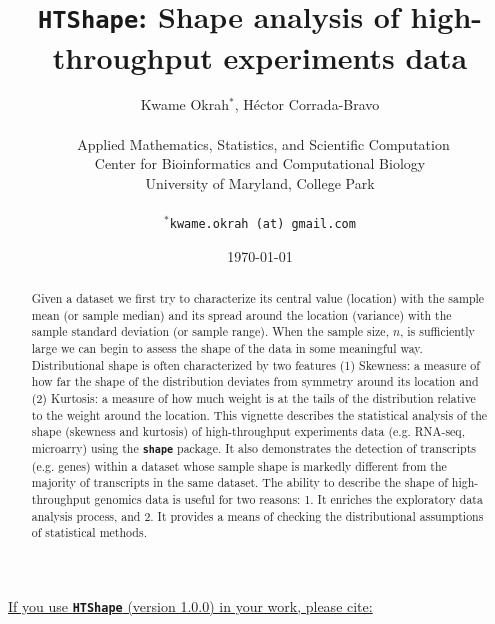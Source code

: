 \documentclass[a4paper, 10pt]{article}\usepackage[]{graphicx}\usepackage[]{color}
\begin{document}


\title{{\textbf{\texttt{HTShape}}: Shape analysis of high-throughput experiments data}}

\author{Kwame Okrah${}^{*}$,  H\'ector Corrada-Bravo \\\\\ 
        Applied Mathematics, Statistics, and Scientific Computation \\ 
        Center for Bioinformatics and Computational Biology \\ 
        University of Maryland, College Park \\\\ 
        \texttt{${}^{*}$kwame.okrah (at) gmail.com}}

\date{\today}

\maketitle

\begin{abstract}
\normalsize
Given a dataset we first try to characterize 
its central value (location) with the sample 
mean (or sample median) and its spread around 
the location (variance) with the sample standard 
deviation (or sample range).
When the sample size, $n$, is sufficiently 
large we can begin to assess the shape of the 
data in some meaningful way. 
Distributional shape is often characterized by 
two features 
(1) Skewness: a measure of how far the
shape of the distribution deviates from symmetry
around its location and 
(2) Kurtosis: a measure of how much
weight is at the tails of the distribution relative 
to the weight around the location.
This vignette describes the statistical 
analysis of the shape (skewness and kurtosis)
of high-throughput experiments data 
(e.g. RNA-seq, microarry) using the 
\textbf{\texttt{shape}} package. 
It also demonstrates the detection of 
transcripts (e.g. genes) within a dataset
whose sample shape is markedly different from 
the majority of transcripts in the same dataset. 
The ability to describe the shape of high-throughput
genomics data is useful for two reasons: 
1. It enriches the exploratory data analysis process, and
2. It provides a means of checking the distributional 
assumptions of statistical methods.
\end{abstract}

\vspace{1 cm}

\noindent \underline{If you use 
\textbf{\texttt{HTShape}} 
(version 1.0.0) 
in your work, please cite:}
\end{document}
